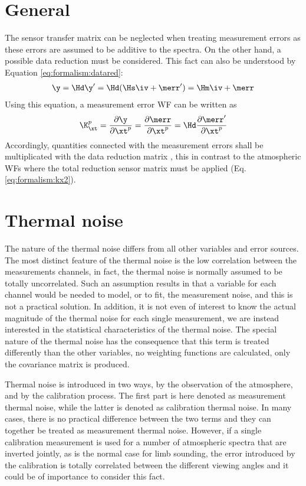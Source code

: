 \section{General}
 \label{sec:measerr:general}
 
 The sensor transfer matrix can be neglected when treating measurement
 errors as these errors are assumed to be additive to the spectra. On
 the other hand, a possible data reduction must be considered. This
 fact can also be understood by Equation \ref{eq:formalism:datared}:
 \begin{eqnarray}
   \y = \Hd \y' = \Hd (\Hs \iv + \merr') = \Hm \iv + \merr \nonumber
 \end{eqnarray}
 Using this equation, a measurement error WF can be
 written as
 \begin{equation}
    \K_{\xt}^p = \frac{\partial \y}{\partial \xt^p} 
               = \frac{\partial \merr}{\partial \xt^p}
               =  \Hd \frac{\partial \merr'}{\partial \xt^p}
  \label{eq:measerr:kx}
 \end{equation}
 Accordingly, quantities connected with the measurement errors shall be
 multiplicated with the data reduction matrix \Hd, this in contrast to
 the atmospheric WFs where the total reduction sensor matrix must be applied
 (Eq. \ref{eq:formalism:kx2}).



\section{Thermal noise}
 \label{sec:measerr:tn}
 
 The nature of the thermal noise differs from all other variables and
 error sources. The most distinct feature of the thermal noise is the
 low correlation between the measurements channels, in fact, the
 thermal noise is normally assumed to be totally uncorrelated. Such an
 assumption results in that a variable for each channel would be
 needed to model, or to fit, the measurement noise, and this is not a
 practical solution. In addition, it is not even of interest to know
 the actual magnitude of the thermal noise for each single
 measurement, we are instead interested in the statistical
 characteristics of the thermal noise.  The special nature of the
 thermal noise has the consequence that this term is treated
 differently than the other variables, no weighting
 functions are calculated, only the covariance matrix is produced.
 
 Thermal noise is introduced in two ways, by the observation of the
 atmosphere, and by the calibration process. The first part is here
 denoted as measurement thermal noise, while the latter is denoted as
 calibration thermal noise. In many cases, there is no practical
 difference between the two terms and they can together be treated as
 measurement thermal noise. However, if a single calibration
 measurement is used for a number of atmospheric spectra that are
 inverted jointly, as is the normal case for limb sounding, the error
 introduced by the calibration is totally correlated between the
 different viewing angles and it could be of importance to consider
 this fact.
 

